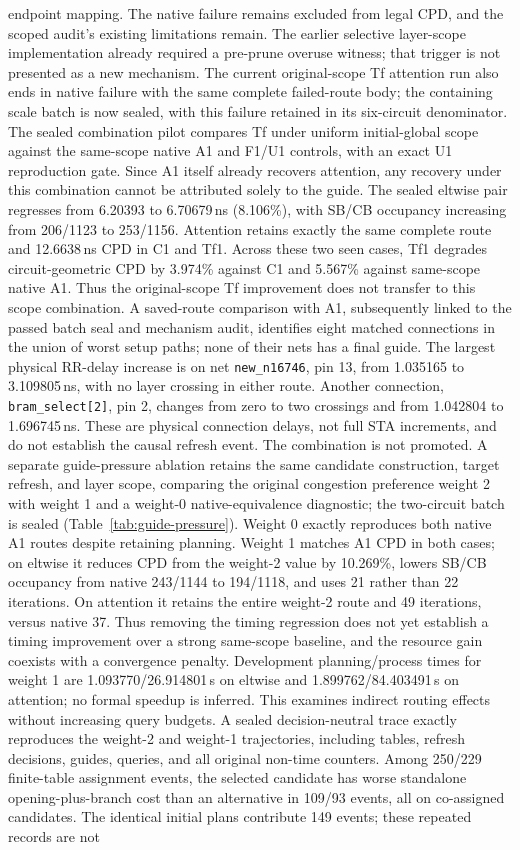 \documentclass[conference,10pt]{IEEEtran}
\begin{document}
endpoint mapping. The native failure remains excluded from legal CPD, and the scoped audit's existing limitations remain. The earlier selective layer-scope implementation already required a pre-prune overuse witness; that trigger is not presented as a new mechanism. The current original-scope Tf attention run also ends in native failure with the same complete failed-route body; the containing scale batch is now sealed, with this failure retained in its six-circuit denominator. The sealed combination pilot compares Tf under uniform initial-global scope against the same-scope native A1 and F1/U1 controls, with an exact U1 reproduction gate. Since A1 itself already recovers attention, any recovery under this combination cannot be attributed solely to the guide. The sealed eltwise pair regresses from 6.20393 to 6.70679\,ns (8.106\%), with SB/CB occupancy increasing from 206/1123 to 253/1156. Attention retains exactly the same complete route and 12.6638\,ns CPD in C1 and Tf1. Across these two seen cases, Tf1 degrades circuit-geometric CPD by 3.974\% against C1 and 5.567\% against same-scope native A1. Thus the original-scope Tf improvement does not transfer to this scope combination. A saved-route comparison with A1, subsequently linked to the passed batch seal and mechanism audit, identifies eight matched connections in the union of worst setup paths; none of their nets has a final guide. The largest physical RR-delay increase is on net \texttt{new\_n16746}, pin 13, from 1.035165 to 3.109805\,ns, with no layer crossing in either route. Another connection, \texttt{bram\_select[2]}, pin 2, changes from zero to two crossings and from 1.042804 to 1.696745\,ns. These are physical connection delays, not full STA increments, and do not establish the causal refresh event. The combination is not promoted. A separate guide-pressure ablation retains the same candidate construction, target refresh, and layer scope, comparing the original congestion preference weight 2 with weight 1 and a weight-0 native-equivalence diagnostic; the two-circuit batch is sealed (Table~\ref{tab:guide-pressure}). Weight 0 exactly reproduces both native A1 routes despite retaining planning. Weight 1 matches A1 CPD in both cases; on eltwise it reduces CPD from the weight-2 value by 10.269\%, lowers SB/CB occupancy from native 243/1144 to 194/1118, and uses 21 rather than 22 iterations. On attention it retains the entire weight-2 route and 49 iterations, versus native 37. Thus removing the timing regression does not yet establish a timing improvement over a strong same-scope baseline, and the resource gain coexists with a convergence penalty. Development planning/process times for weight 1 are 1.093770/26.914801\,s on eltwise and 1.899762/84.403491\,s on attention; no formal speedup is inferred. This examines indirect routing effects without increasing query budgets. A sealed decision-neutral trace exactly reproduces the weight-2 and weight-1 trajectories, including tables, refresh decisions, guides, queries, and all original non-time counters. Among 250/229 finite-table assignment events, the selected candidate has worse standalone opening-plus-branch cost than an alternative in 109/93 events, all on co-assigned candidates. The identical initial plans contribute 149 events; these repeated records are not 
\end{document}

